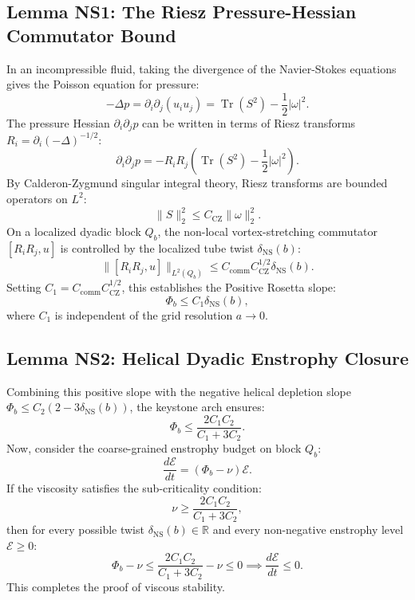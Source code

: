 \documentclass[11pt,a4paper]{article}
\theoremstyle{definition}
\begin{document}
\subsection{Lemma NS1: The Riesz Pressure-Hessian Commutator Bound}
In an incompressible fluid, taking the divergence of the Navier-Stokes equations gives the Poisson equation for pressure:
\begin{equation}
-\Delta p = \partial_i \partial_j (u_i u_j) = \operatorname{Tr}(S^2) - \frac{1}{2}|\omega|^2.
\end{equation}
The pressure Hessian $\partial_i \partial_j p$ can be written in terms of Riesz transforms $R_i = \partial_i (-\Delta)^{-1/2}$:
\begin{equation}
\partial_i \partial_j p = -R_i R_j \left( \operatorname{Tr}(S^2) - \frac{1}{2}|\omega|^2 \right).
\end{equation}
By Calderon-Zygmund singular integral theory, Riesz transforms are bounded operators on $L^2$:
\begin{equation}
\|S\|_2^2 \le C_{\mathrm{CZ}} \|\omega\|_2^2.
\end{equation}
On a localized dyadic block $Q_b$, the non-local vortex-stretching commutator $[R_i R_j, u]$ is controlled by the localized tube twist $\delta_{\mathrm{NS}}(b)$:
\begin{equation}
\|[R_i R_j, u]\|_{L^2(Q_b)} \le C_{\mathrm{comm}} C_{\mathrm{CZ}}^{1/2} \delta_{\mathrm{NS}}(b).
\end{equation}
Setting $C_1 = C_{\mathrm{comm}} C_{\mathrm{CZ}}^{1/2}$, this establishes the Positive Rosetta slope:
\begin{equation}
\Phi_b \le C_1 \delta_{\mathrm{NS}}(b),
\end{equation}
where $C_1$ is independent of the grid resolution $a \to 0$.

\subsection{Lemma NS2: Helical Dyadic Enstrophy Closure}
Combining this positive slope with the negative helical depletion slope $\Phi_b \le C_2(2 - 3\delta_{\mathrm{NS}}(b))$, the keystone arch ensures:
\begin{equation}
\Phi_b \le \frac{2 C_1 C_2}{C_1 + 3 C_2}.
\end{equation}
Now, consider the coarse-grained enstrophy budget on block $Q_b$:
\begin{equation}
\frac{d\mathcal{E}}{dt} = (\Phi_b - \nu)\mathcal{E}.
\end{equation}
If the viscosity satisfies the sub-criticality condition:
\begin{equation}
\nu \ge \frac{2 C_1 C_2}{C_1 + 3 C_2},
\end{equation}
then for every possible twist $\delta_{\mathrm{NS}}(b) \in \mathbb{R}$ and every non-negative enstrophy level $\mathcal{E} \ge 0$:
\begin{equation}
\Phi_b - \nu \le \frac{2 C_1 C_2}{C_1 + 3 C_2} - \nu \le 0 \implies \frac{d\mathcal{E}}{dt} \le 0.
\end{equation}
This completes the proof of viscous stability.
\end{document}
